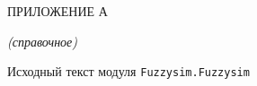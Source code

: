\lstset{style=pythoninlinestyle}

%


 \begin{center}
	ПРИЛОЖЕНИЕ А
	
	\textit{(справочное)}
\end{center}


\begin{center}
	Исходный текст модуля \lstinline!Fuzzysim.Fuzzysim!
\end{center}



